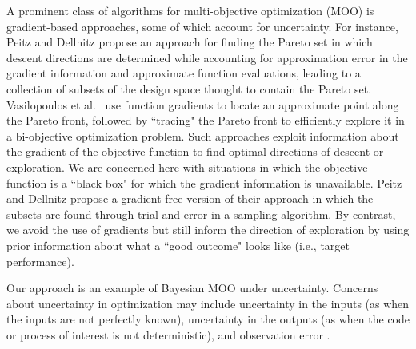 \documentclass[twocolumn,10pt]{asme2ej}
\begin{document}
%
A prominent class of algorithms for multi-objective optimization (MOO) is gradient-based approaches, some of which account for uncertainty. For instance, Peitz and Dellnitz \cite{Peitz2018} propose an approach for finding the Pareto set in which descent directions are determined while accounting for approximation error in the gradient information and approximate function evaluations, leading to a collection of subsets of the design space thought to contain the Pareto set. Vasilopoulos et al.\ \cite{Vasilopoulos2019} use function gradients to locate an approximate point along the Pareto front, followed by ``tracing" the Pareto front to efficiently explore it in a bi-objective optimization problem. Such approaches exploit information about the gradient of the objective function to find optimal directions of descent or exploration. We are concerned here with situations in which the objective function is a ``black box" for which the gradient information is unavailable. Peitz and Dellnitz propose a gradient-free version of their approach in which the subsets are found through trial and error in a sampling algorithm. By contrast, we avoid the use of gradients but still inform the direction of exploration by using prior information about what a ``good outcome" looks like (i.e., target performance).

%
Our approach is an example of Bayesian MOO under uncertainty. Concerns about uncertainty in optimization may include uncertainty in the inputs (as when the inputs are not perfectly known), uncertainty in the outputs (as when the code or process of interest is not deterministic), and observation error \cite{Jin2005,Deb2006,Zhou2011a}. 
%
%
\end{document}
